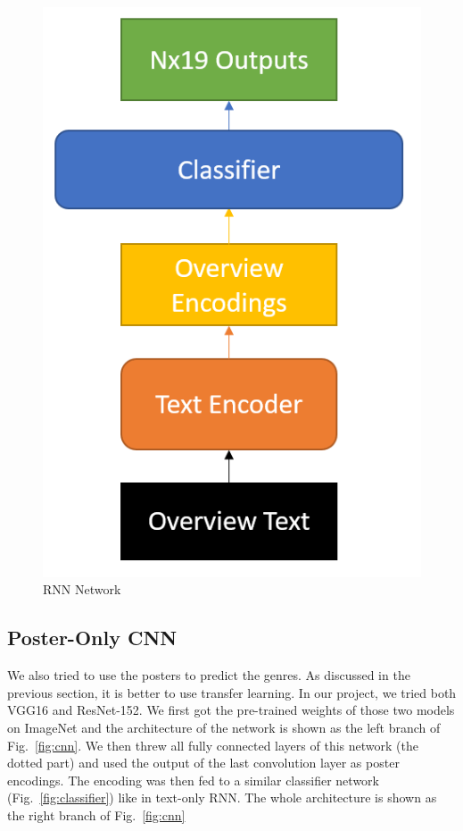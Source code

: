 \documentclass[12pt]{article} %
\begin{document}
\begin{figure}[H]
\begin{minipage}{0.28\textwidth}
  \includegraphics[width=\linewidth]{txt_network.png}
  \caption{RNN Network}
  \label{fig:text-net}
\end{minipage}%
\end{figure}

\subsection{Poster-Only CNN}

We also tried to use the posters to predict the genres. As discussed in the previous section, it is better to use transfer learning. In our project, we tried both VGG16 and ResNet-152. We first got the pre-trained weights of those two models on ImageNet and the architecture of the network is shown as the left branch of Fig.~\ref{fig:cnn}. We then threw all fully connected layers of this network (the dotted part) and used the output of the last convolution layer as poster encodings. The encoding was then fed to a similar classifier network (Fig.~\ref{fig:classifier}) like in text-only RNN. The whole architecture is shown as the right branch of Fig.~\ref{fig:cnn}
\end{document}
